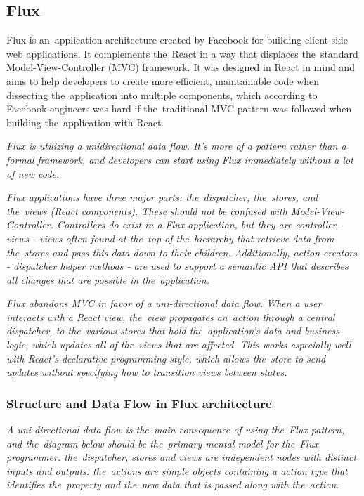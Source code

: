 \subsection{Flux}
Flux is an~application architecture created by Facebook for building client-side web applications. It complements the~React in a way that displaces the~standard Model-View-Controller (MVC) framework. It was designed in React in mind and aims to help developers to create more efficient, maintainable code when dissecting the~application into multiple components, which according to Facebook engineers was hard if the~traditional MVC pattern was followed when building the~application with React.\citep{gackenheimer}

\textsl{Flux is utilizing a unidirectional data flow. It's more of a pattern rather than a formal framework, and developers can start using Flux immediately without a lot of new code.} \citep{flux}

\textsl{Flux applications have three major parts: the~dispatcher, the~stores, and the~views (React components). These should not be confused with Model-View-Controller. Controllers do exist in a Flux application, but they are controller-views - views often found at the~top of the~hierarchy that retrieve data from the~stores and pass this data down to their children. Additionally, action creators - dispatcher helper methods - are used to support a semantic API that describes all changes that are possible in the~application.} \citep{flux}

\textsl{Flux abandons MVC in favor of a uni-directional data flow. When a user interacts with a React view, the~view propagates an~action through a central dispatcher, to the~various stores that hold the~application's data and business logic, which updates all of the~views that are affected. This works especially well with React's declarative programming style, which allows the~store to send updates without specifying how to transition views between states.} \citep{flux}

\subsubsection{Structure and Data Flow in Flux architecture}
\textsl{A uni-directional data flow is the~main consequence of using the~Flux pattern, and the~diagram below should be the~primary mental model for the~Flux programmer. the~dispatcher, stores and views are independent nodes with distinct inputs and outputs. the~actions are simple objects containing a action type that identifies the~property and the~new data that is passed along with the~action.} \citep{flux}

